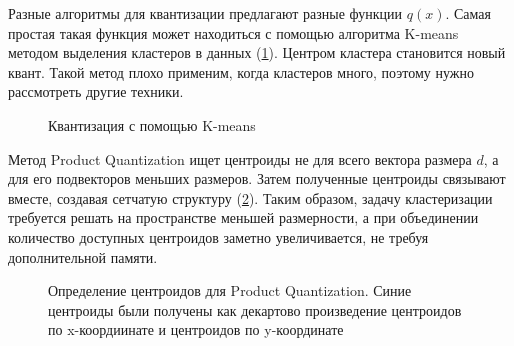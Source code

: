 \documentclass[a4paper,12pt]{extarticle}
\begin{document}
Разные алгоритмы для квантизации предлагают разные функции $q(x)$. Самая простая такая функция может находиться с помощью алгоритма K-means методом выделения кластеров в данных (\cref{ris:kmeans}). Центром кластера становится новый квант. Такой метод плохо применим, когда кластеров много, поэтому нужно рассмотреть другие техники.

\begin{center}
\begin{figure}[H]
\caption{Квантизация с помощью K-means}
\label{ris:kmeans}
\end{figure}
\end{center}

Метод Product Quantization ищет центроиды не для всего вектора размера $d$, а для его подвекторов меньших размеров. Затем полученные центроиды связывают вместе, создавая сетчатую структуру (\cref{ris:pq}). Таким образом, задачу кластеризации требуется решать на пространстве меньшей размерности, а при объединении количество доступных центроидов заметно увеличивается, не требуя дополнительной памяти.

\begin{center}
\begin{figure}[H]
\caption{Определение центроидов для Product Quantization. Синие центроиды были получены как декартово произведение центроидов по x-коордиинате и центроидов по y-координате}
\label{ris:pq}
\end{figure}
\end{center}
\end{document}
